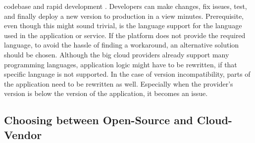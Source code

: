 \documentclass[a4paper,11pt, pagesize]{scrartcl}
\begin{document}
\begin{spacing}{1.2}
codebase and rapid development \cite{sewak2018winning} \cite{leitner2019mixed}. Developers can make changes, fix issues, test, and finally deploy a new version to production in a view minutes. Prerequisite, even though this might sound trivial, is the language support for the language used in the application or service. If the platform does not provide the required language, to avoid the hassle of finding a workaround, an alternative solution should be chosen. Although the big cloud providers already support many programming languages, application logic might have to be rewritten, if that specific language is not supported. In the case of version incompatibility, parts of the application need to be rewritten as well. Especially when the provider's version is below the version of the application, it becomes an issue.
\subsection{Choosing between Open-Source and Cloud-Vendor}

\end{spacing}
\end{document}
